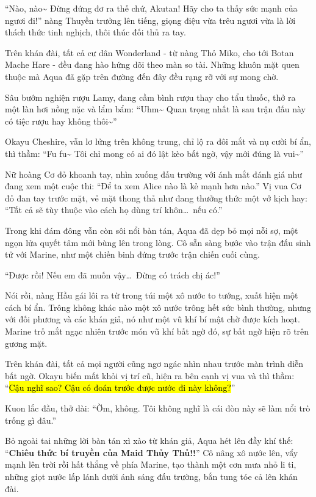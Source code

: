\documentclass[../main.tex]{subfiles}
\begin{document}
``Nào, nào\~{} Đừng đứng đơ ra thế chứ, Akutan! Hãy cho ta thấy sức mạnh của ngươi đi!'' nàng Thuyền trưởng lên tiếng, giọng điệu vừa trêu ngươi vừa là lời thách thức tinh nghịch, thôi thúc đối thủ ra tay.

Trên khán đài, tất cả cư dân Wonderland - từ nàng Thỏ Miko, cho tới Botan Mache Hare - đều đang hào hứng dõi theo màn so tài. Những khuôn mặt quen thuộc mà Aqua đã gặp trên đường đến đây đều rạng rỡ với sự mong chờ.

Sâu bướm nghiện rượu Lamy, đang cầm bình rượu thay cho tẩu thuốc, thở ra một làn hơi nồng nặc và lẩm bẩm: ``Uhm\~{} Quan trọng nhất là sau trận đấu này có tiệc rượu hay không thôi\~{}''

Okayu Cheshire, vẫn lơ lửng trên không trung, chỉ lộ ra đôi mắt và nụ cười bí ẩn, thì thầm: ``Fu fu\~{} Tôi chỉ mong có ai đó lật kèo bất ngờ, vậy mới đúng là vui\~{}''

Nữ hoàng Cơ đỏ khoanh tay, nhìn xuống đấu trường với ánh mắt đánh giá như đang xem một cuộc thi: ``Để ta xem Alice nào là kẻ mạnh hơn nào.'' Vị vua Cơ đỏ đan tay trước mặt, vẻ mặt thong thả như đang thưởng thức một vở kịch hay: ``Tất cả sẽ tùy thuộc vào cách họ dùng trí khôn\dots\ nếu có.''

Trong khi đám đông vẫn còn sôi nổi bàn tán, Aqua đã dẹp bỏ mọi nỗi sợ, một ngọn lửa quyết tâm mới bùng lên trong lòng. Cô sẵn sàng bước vào trận đấu sinh tử với Marine, như một chiến binh đứng trước trận chiến cuối cùng.

``Được rồi! Nếu em đã muốn vậy\dots\ Đừng có trách chị ác!''

Nói rồi, nàng Hầu gái lôi ra từ trong túi một xô nước to tướng, xuất hiện một cách bí ẩn. Trông không khác nào một xô nước trông hết sức bình thường, nhưng với đối phương và các khán giả, nó như một vũ khí bí mật chờ được kích hoạt. Marine trố mắt ngạc nhiên trước món vũ khí bất ngờ đó, sự bất ngờ hiện rõ trên gương mặt.

Trên khán đài, tất cả mọi người cũng ngơ ngác nhìn nhau trước màn trình diễn bất ngờ. Okayu biến mất khỏi vị trí cũ, hiện ra bên cạnh vị vua và thì thầm: ``\hl{Cậu nghĩ sao? Cậu có đoán trước được nước đi này không?}''

Kuon lắc đầu, thở dài: ``Ờm, không. Tôi không nghĩ là cái đòn này sẽ làm nổi trò trống gì đâu.''

Bỏ ngoài tai những lời bàn tán xì xào từ khán giả, Aqua hét lên đầy khí thế: ``\textbf{Chiêu thức bí truyền của Maid Thủy Thủ!!}'' Cô nâng xô nước lên, vẩy mạnh lên trời rồi hất thẳng về phía Marine, tạo thành một cơn mưa nhỏ li ti, những giọt nước lấp lánh dưới ánh sáng đấu trường, bắn tung tóe cả lên khán đài.
\end{document}
